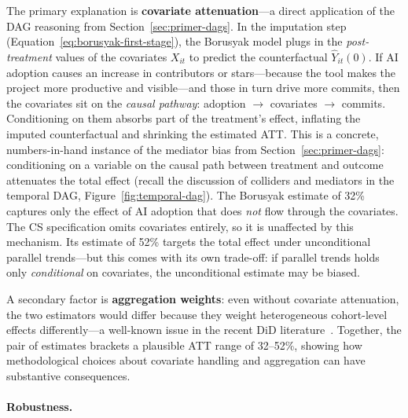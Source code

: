 The primary explanation is \textbf{covariate attenuation}---a direct application of the DAG reasoning from Section~\ref{sec:primer-dags}.
In the imputation step (Equation~\ref{eq:borusyak-first-stage}), the Borusyak model plugs in the \emph{post-treatment} values of the covariates $X_{it}$ to predict the counterfactual $\hat{Y}_{it}(0)$.
If AI adoption causes an increase in contributors or stars---because the tool makes the project more productive and visible---and those in turn drive more commits, then the covariates sit on the \emph{causal pathway}: adoption $\to$ covariates $\to$ commits.
Conditioning on them absorbs part of the treatment's effect, inflating the imputed counterfactual and shrinking the estimated ATT\@.
This is a concrete, numbers-in-hand instance of the mediator bias from Section~\ref{sec:primer-dags}: conditioning on a variable on the causal path between treatment and outcome attenuates the total effect (recall the discussion of colliders and mediators in the temporal DAG, Figure~\ref{fig:temporal-dag}).
The Borusyak estimate of 32\% captures only the effect of AI adoption that does \emph{not} flow through the covariates.
The CS specification omits covariates entirely, so it is unaffected by this mechanism.
Its estimate of 52\% targets the total effect under unconditional parallel trends---but this comes with its own trade-off: if parallel trends holds only \emph{conditional} on covariates, the unconditional estimate may be biased.

A secondary factor is \textbf{aggregation weights}: even without covariate attenuation, the two estimators would differ because they weight heterogeneous cohort-level effects differently---a well-known issue in the recent DiD literature~\cite{roth2023whats}.
Together, the pair of estimates brackets a plausible ATT range of 32--52\%, showing how methodological choices about covariate handling and aggregation can have substantive consequences.

\paragraph{Robustness.}
\label{sec:robustness}


